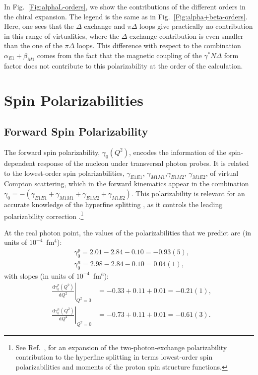 \documentclass[twocolumn,prc,showpacs,nofootinbib,preprintnumbers,amsmath,amssymb,superscriptaddress]{revtex4-1}
\def\dd{\mathrm{d}}
\begin{document}
In Fig.~\ref{Fig:alphaL-orders}, we show the contributions of the different orders in the chiral expansion. 
The legend is the same as in Fig.~\ref{Fig:alpha+beta-orders}. 
Here, one sees that the $\Delta$ exchange and $\pi \Delta$ loops give practically no contribution in this range of virtualities, where the $\Delta$ exchange contribution is even smaller than the one of the $\pi \Delta$ loops. 
This difference with respect to the combination $\alpha_{E1}+\beta_{M1}$ comes from the fact that the magnetic coupling of the $\gamma^* N \Delta$ form factor does not contribute to this polarizability at the order of the calculation.







\section{Spin Polarizabilities}
\label{Sec:Spin-Pol}

\subsection{Forward Spin Polarizability}
\label{Sec:ForwardSpinPolarizability}

The forward spin polarizability, $\gamma_0(Q^2)$, encodes the information of the spin-dependent response of the nucleon under transversal photon probes. 
It is related to the lowest-order spin polarizabilities, $\gamma_{E1E1}$, $\gamma_{M1M1}$,$\gamma_{E1M2}$, $\gamma_{M1E2}$, of virtual Compton scattering, which in the forward kinematics appear in the combination $\gamma_0=-(\gamma_{E1E1} + \gamma_{M1M1} + \gamma_{E1M2}+\gamma_{M1E2})$. 
This polarizability is relevant for an accurate knowledge of the hyperfine splitting \cite{Hagelstein:2015egb,Hagelstein:2015lph}, as it controls the leading polarizability correction \cite{Carlson:2008ke}.\footnote{See Ref.~\cite{Hagelstein:2017cbl}, for an expansion of the two-photon-exchange polarizability contribution to the hyperfine splitting in terms lowest-order spin polarizabilities and moments of the proton spin structure functions.} 


At the real photon point, the values of the polarizabilities that we predict are (in units of $10^{-4}$~fm$^4$):
\begin{align}
&\gamma^p_0 = 2.01 - 2.84 -0.10=-0.93(5), \label{Eq:gamma0ProtonRealPoint}\\
&\gamma^n_0 = 2.98 - 2.84-0.10  = 0.04(1),
\end{align}
with slopes (in units of $10^{-4}$~fm$^6$):
\begin{align}
&\left.\frac{\dd\gamma_0^p (Q^2)}{\dd Q^2}\right|_{Q^2=0}&=  -0.33  +0.11 +0.01 = -0.21(1),  \\
&\left.\frac{\dd\gamma_0^n (Q^2)}{\dd Q^2}\right|_{Q^2=0}&=  -0.73 +0.11 +0.01 =-0.61(3).
\end{align}
\end{document}
